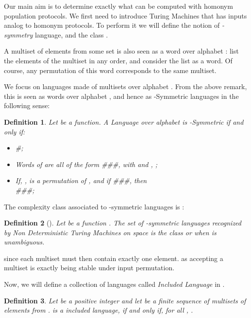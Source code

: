 \documentclass[UKenglish]{llncs}
\newtheorem{define}{Definition}
\newcommand\motnouv[1]{{\emph{#1}}}
\begin{document}
Our  main aim  is to determine exactly what can be computed
with homonym population protocols. We first need to introduce
Turing Machines that has inputs analog to homonym protocols. To perform it
we  will define the notion of \emph{-symmetry} language,
and   the  class .




A multiset of elements from some set  is also  seen as a
word over alphabet : list the elements of the multiset in any
order, and consider the list as a word. Of course, any permutation of
this word corresponds to the same multiset. 

We focus on languages made of  multisets over alphabet
. From the above remark, this is seen as words over alphabet
, and hence as -Symmetric languages in the
following sense: 


\begin{define}\label{defmnspace}
 Let  be a function. 
A Language  over alphabet  is  \motnouv{-Symmetric} if  and only if:
\begin{itemize}
\item \#;
\item Words of  are all of the form \#\#\#, with  and
, ;
\item If, ,  is a permutation of , and if \#\#\#, 
then \\ \#\#\#;

\end{itemize}
\end{define}

The complexity class associated to   -symmetric languages is :


\begin{define}[]
Let  be a function 
. The set of -symmetric languages recognized by Non Deterministic
Turing Machines on  space  is the class   \motnouv{}
 or  \motnouv{} when  is unambiguous.
\end{define}


\begin{remark}  since each multiset
must then contain exactly one element.
       as accepting a multiset
is exactly being stable under input permutation.
\end{remark}

Now, we will define a collection of languages called \emph{Included Language} in . 

\begin{define}
Let  be a positive integer and let  be a finite
sequence of multisets of elements from .
 is a  \motnouv{included language}, if and only if, for all , .
\end{define}
\end{document}
